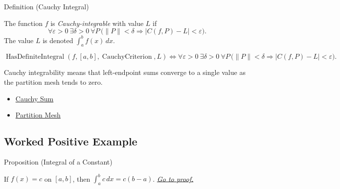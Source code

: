\begin{definitionbox}{Definition (Cauchy Integral)}
\begin{definition}
\label{def:cauchy-integral}
The function \(f\) is \emph{Cauchy-integrable} with value \(L\) if
\[
  \forall\varepsilon>0\ \exists\delta>0\ \forall P\,
  \bigl(\|P\|<\delta\Rightarrow |C(f,P)-L|<\varepsilon\bigr).
\]
The value \(L\) is denoted \(\int_a^b f(x)\,dx\).
\end{definition}
\end{definitionbox}

\begin{remark*}
\[
\operatorname{HasDefiniteIntegral}(f,[a,b],\operatorname{CauchyCriterion},L)
\Longleftrightarrow
\forall\varepsilon>0\ \exists\delta>0\ \forall P\,
\bigl(\|P\|<\delta\Rightarrow |C(f,P)-L|<\varepsilon\bigr).
\]
\end{remark*}

\begin{remark*}[Interpretation]
Cauchy integrability means that left-endpoint sums converge to a single value
as the partition mesh tends to zero.
\end{remark*}

\begin{dependencies}
\begin{itemize}
  \item \hyperref[def:cauchy-sum]{Cauchy Sum}
  \item \hyperref[def:partition-mesh]{Partition Mesh}
\end{itemize}
\end{dependencies}

\subsection*{Worked Positive Example}

\begin{propositionbox}{Proposition (Integral of a Constant)}
\begin{proposition}
\label{prop:cauchy-integral-constant}
If \(f(x)=c\) on \([a,b]\), then \(\int_a^b c\,dx=c(b-a)\).
\hyperref[prf:cauchy-integral-constant]{\textit{Go to proof.}}
\end{proposition}
\end{propositionbox}


